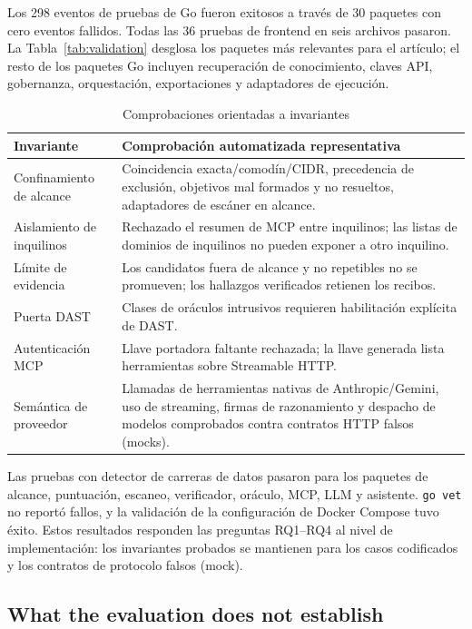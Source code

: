\documentclass[conference,a4paper]{IEEEtran}
\newcommand{\code}[1]{\texttt{#1}}
\begin{document}
Los 298 eventos de pruebas de Go fueron exitosos a través de 30 paquetes con cero eventos fallidos. Todas las 36 pruebas de frontend en seis archivos pasaron. La Tabla~\ref{tab:validation} desglosa los paquetes más relevantes para el artículo; el resto de los paquetes Go incluyen recuperación de conocimiento, claves API, gobernanza, orquestación, exportaciones y adaptadores de ejecución.

\begin{table}[t]
\centering
\caption{Comprobaciones orientadas a invariantes}
\label{tab:invariants}
\begin{tabular}{p{}p{}}
\toprule
Invariante & Comprobación automatizada representativa \\
\midrule
Confinamiento de alcance & Coincidencia exacta/comodín/CIDR, precedencia de exclusión, objetivos mal formados y no resueltos, adaptadores de escáner en alcance. \\
Aislamiento de inquilinos & Rechazado el resumen de MCP entre inquilinos; las listas de dominios de inquilinos no pueden exponer a otro inquilino. \\
Límite de evidencia & Los candidatos fuera de alcance y no repetibles no se promueven; los hallazgos verificados retienen los recibos. \\
Puerta DAST & Clases de oráculos intrusivos requieren habilitación explícita de DAST. \\
Autenticación MCP & Llave portadora faltante rechazada; la llave generada lista herramientas sobre Streamable HTTP. \\
Semántica de proveedor & Llamadas de herramientas nativas de Anthropic/Gemini, uso de streaming, firmas de razonamiento y despacho de modelos comprobados contra contratos HTTP falsos (mocks). \\
\bottomrule
\end{tabular}
\end{table}

Las pruebas con detector de carreras de datos pasaron para los paquetes de alcance, puntuación, escaneo, verificador, oráculo, MCP, LLM y asistente. \code{go vet} no reportó fallos, y la validación de la configuración de Docker Compose tuvo éxito. Estos resultados responden las preguntas RQ1--RQ4 al nivel de implementación: los invariantes probados se mantienen para los casos codificados y los contratos de protocolo falsos (mock).

\subsection{What the evaluation does not establish}
\end{document}
